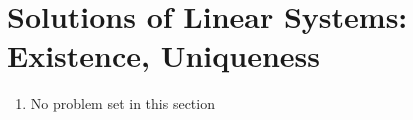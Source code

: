 \section{Solutions of Linear Systems: Existence, Uniqueness}

\begin{enumerate}
    \item No problem set in this section
\end{enumerate}